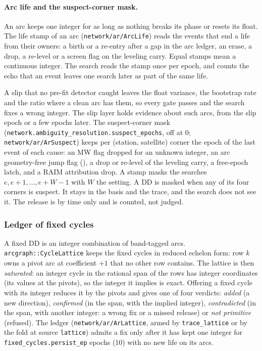 \documentclass[main.tex]{subfiles}
\begin{document}
\paragraph{Arc life and the suspect-corner mask.}
An arc keeps one integer for as long as nothing breaks its phase or resets its
float.  The life stamp of an arc (\texttt{network/ar/ArcLife}) reads the
events that end a life from their owners: a birth or a re-entry after a gap
in the arc ledger, an erase, a drop, a re-level or a screen flag on the
leveling carry.  Equal stamps mean a continuous integer.  The search reads
the stamp once per epoch, and counts the echo that an event leaves one search
later as part of the same life.

A slip that no pre-fit detector caught leaves the float variance, the
bootstrap rate and the ratio where a clean arc has them, so every gate passes
and the search fixes a wrong integer.  The slip layer holds evidence about such
arcs, from the slip epoch or a few epochs later.  The suspect-corner mask
(\texttt{network.ambiguity\_resolution.suspect\_epochs}, off at 0;
\texttt{network/ar/ArSuspect}) keeps per (station, satellite) corner the
epoch of the last event of each cause: an MW flag dropped for an unknown
integer, an arc geometry-free jump flag
(), a drop or
re-level of the leveling carry, a free-epoch latch, and a RAIM attribution
drop.  A stamp masks the searches $e, e+1, \dots, e+W-1$ with $W$ the setting.
A DD is masked when any of its four corners is suspect.  It stays in the basis
and the trace, and the search does not see it.  The release is by time only
and is counted, not judged.

\subsubsection{Ledger of fixed cycles}\label{sec:ar-lattice}

A fixed DD is an integer combination of band-tagged arcs.
\texttt{arcgraph::CycleLattice} keeps the fixed cycles in reduced echelon
form: row $k$ owns a pivot arc at coefficient $+1$ that no other row
contains.  The lattice is then \emph{saturated}: an integer cycle in the
rational span of the rows has integer coordinates (its values at the pivots),
so the integer it implies is exact.  Offering a fixed cycle with its integer
reduces it by the pivots and gives one of four verdicts: \emph{added} (a new
direction), \emph{confirmed} (in the span, with the implied integer),
\emph{contradicted} (in the span, with another integer: a wrong fix or a
missed release) or \emph{not primitive} (refused).  The ledger
(\texttt{network/ar/ArLattice}, armed by \texttt{trace\_lattice} or by the fold
at source \texttt{lattice}) admits a fix only after it has kept one integer for
\texttt{fixed\_cycles.persist\_ep} epochs (10) with no new life on its arcs.
\end{document}
